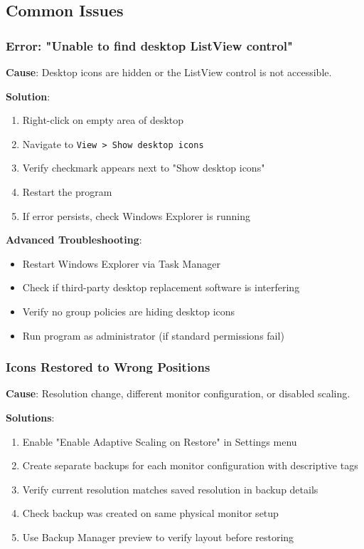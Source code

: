 \documentclass[a4paper,11pt]{article}
\begin{document}
\subsection{Common Issues}

\subsubsection{Error: "Unable to find desktop ListView control"}

\textbf{Cause}: Desktop icons are hidden or the ListView control is
not accessible.

\textbf{Solution}:
\begin{enumerate}
  \item Right-click on empty area of desktop
  \item Navigate to \texttt{View > Show desktop icons}
  \item Verify checkmark appears next to "Show desktop icons"
  \item Restart the program
  \item If error persists, check Windows Explorer is running
\end{enumerate}

\textbf{Advanced Troubleshooting}:
\begin{itemize}
  \item Restart Windows Explorer via Task Manager
  \item Check if third-party desktop replacement software is interfering
  \item Verify no group policies are hiding desktop icons
  \item Run program as administrator (if standard permissions fail)
\end{itemize}

\subsubsection{Icons Restored to Wrong Positions}

\textbf{Cause}: Resolution change, different monitor configuration,
or disabled scaling.

\textbf{Solutions}:
\begin{enumerate}
  \item Enable "Enable Adaptive Scaling on Restore" in Settings menu
  \item Create separate backups for each monitor configuration with
    descriptive tags
  \item Verify current resolution matches saved resolution in backup details
  \item Check backup was created on same physical monitor setup
  \item Use Backup Manager preview to verify layout before restoring
\end{enumerate}
\end{document}
